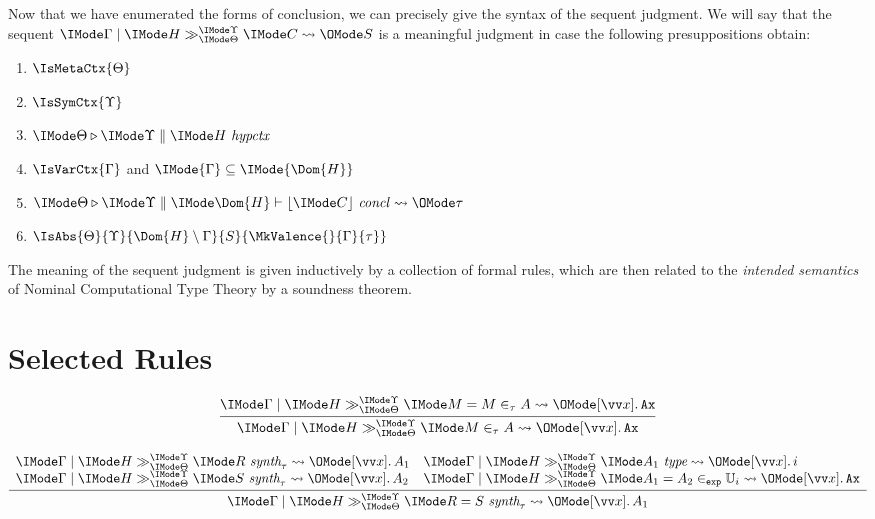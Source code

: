 Now that we have enumerated the forms of conclusion, we can precisely give the
syntax of the sequent judgment. We will say that the sequent
$\PRLSequent{\Gamma}{H}{\Theta}{\Upsilon}{C}{S}$ is a meaningful judgment in
case the following presuppositions obtain:
\begin{enumerate}
  \item $\IsMetaCtx{\Theta}$
  \item $\IsSymCtx{\Upsilon}$
  \item $\IsHypCtx{\Theta}{\Upsilon}{H}$
  \item $\IsVarCtx{\Gamma}$ and $\IMode{\Gamma}\subseteq\IMode{\Dom{H}}$
  \item $\IsConcl{\Theta}{\Upsilon}{\Dom{H}}{C}{\tau}$
  \item $\IsAbs{\Theta}{\Upsilon}{\Dom{H}\setminus \Gamma}{S}{\MkValence{}{\Gamma}{\tau}}$
\end{enumerate}

The meaning of the sequent judgment is given inductively by a collection of
formal rules, which are then related to the \emph{intended semantics} of
Nominal Computational Type Theory by a soundness theorem.

\section{Selected Rules}

\[
  \infer{
    \PRLSequent{\Gamma}{H}{\Theta}{\Upsilon}{M \in_\tau A}{\MkAbs{}{\vec{x}}{\mathtt{Ax}}}
  }{
    \PRLSequent{\Gamma}{H}{\Theta}{\Upsilon}{M = M \in_\tau A}{\MkAbs{}{\vec{x}}{\mathtt{Ax}}}
  }
\]

\[
  \infer{
    \PRLSequent{\Gamma}{H}{\Theta}{\Upsilon}{R = S\ \textit{synth}_\tau}{\MkAbs{}{\vec{x}}{A_1}}
  }{
    \begin{array}{l}
      \PRLSequent{\Gamma}{H}{\Theta}{\Upsilon}{R\ \textit{synth}_\tau}{\MkAbs{}{\vec{x}}{A_1}}\\
      \PRLSequent{\Gamma}{H}{\Theta}{\Upsilon}{S\ \textit{synth}_\tau}{\MkAbs{}{\vec{x}}{A_2}}
    \end{array}
    \begin{array}{l}
      \PRLSequent{\Gamma}{H}{\Theta}{\Upsilon}{A_1\ \textit{type}}{\MkAbs{}{\vec{x}}{i}}\\
      \PRLSequent{\Gamma}{H}{\Theta}{\Upsilon}{A_1=A_2\in_\AbtSortExp \mathbb{U}_i}{\MkAbs{}{\vec{x}}{\mathtt{Ax}}}
    \end{array}
  }
\]

